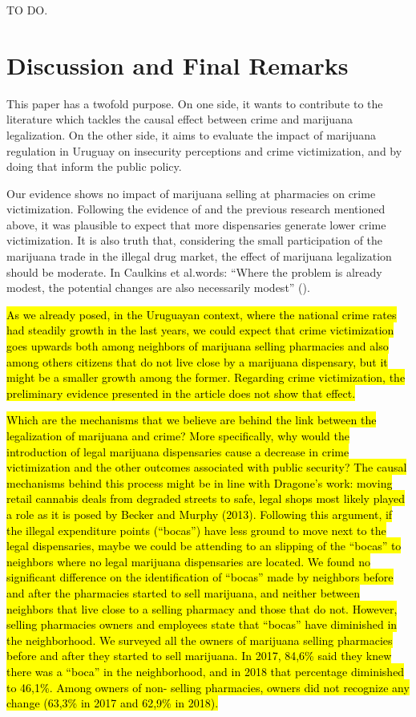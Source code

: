 \documentclass[11pt]{article}
\begin{document}
TO DO.

\section{Discussion and Final Remarks}
This paper has a twofold purpose. On one side, it wants to contribute to the literature which tackles the causal effect between crime and marijuana legalization. On the other side, it aims to evaluate the impact of marijuana regulation in Uruguay on insecurity perceptions and crime victimization, and by doing that inform the public policy.

Our evidence shows no impact of marijuana selling at pharmacies on crime victimization. Following the evidence of \cite{dragone2019crime} and the previous research mentioned above, it was plausible to expect that more dispensaries generate lower crime victimization. It is also truth that, considering the small participation of the marijuana trade in the illegal drug market, the effect of marijuana legalization should be moderate. In Caulkins et al.words: ``Where the problem is already modest, the potential changes are also necessarily modest'' (\citet[154]{caulkins2015considering}).

\hl{As we already posed, in the Uruguayan context, where the national crime rates had steadily growth in the last years, we could expect that crime victimization goes upwards both among neighbors of marijuana selling pharmacies and also among others citizens that do not live close by a marijuana dispensary, but it might be a smaller growth among the former. Regarding crime victimization, the preliminary evidence presented in the article does not show that effect.}

\hl{Which are the mechanisms that we believe are behind the link between the legalization of marijuana and crime? More specifically, why would the introduction of legal marijuana dispensaries cause a decrease in crime victimization and the other outcomes associated with public security? The causal mechanisms behind this process might be in line with Dragone's work: moving retail cannabis deals from degraded streets to safe, legal shops most likely played a role as it is posed by Becker and Murphy (2013). Following this argument, if the illegal expenditure points (``bocas'') have less ground to move next to the legal dispensaries, maybe we could be attending to an slipping of the ``bocas'' to neighbors where no legal marijuana dispensaries are located. We found no significant difference on the identification of ``bocas'' made by neighbors before and after the pharmacies started to sell marijuana, and neither between neighbors that live close to a selling pharmacy and those that do not. However, selling pharmacies owners and employees state that ``bocas'' have diminished in the neighborhood. We surveyed all the owners of marijuana selling pharmacies before and after they started to sell marijuana. In 2017, 84,6\% said they knew there was a ``boca'' in the neighborhood, and in 2018 that percentage diminished to 46,1\%. Among owners of non- selling pharmacies, owners did not recognize any change (63,3\% in 2017 and 62,9\% in 2018).}
\end{document}
